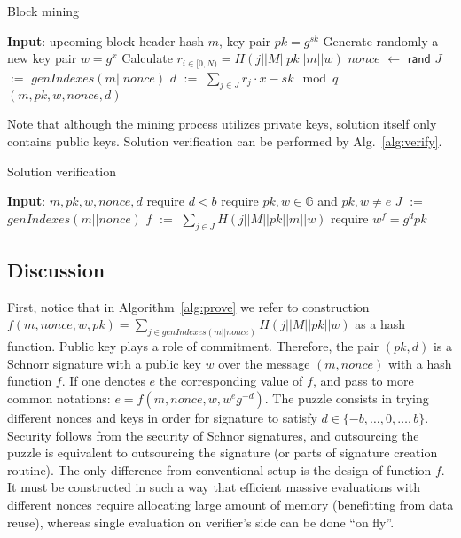 \documentclass[]{article}
\def\Let#1#2{\State #1 $:=$ #2}
\def\LetRnd#1#2{\State #1 $\gets$ #2}
\begin{document}
    \begin{algorithm}[H]
        \caption{Block mining}
        \label{alg:prove}
        \begin{algorithmic}[1]
            \State \textbf{Input}: upcoming block header hash $m$, key pair $pk=g^{sk}$
            \State Generate randomly a new key pair $w=g^x$
            \State Calculate $r_{i \in [0,N)}=H(j||M||pk||m||w)$
            \LetRnd{$nonce$}{$\mathsf{rand}$}
            \Let{$J$}{$genIndexes(m||nonce)$}
            \Let{$d$}{$\sum_{j \in J}{r_j} \cdot x - sk \mod q$}
            \State \Return $(m,pk,w,nonce,d)$
            \EndIf
            \EndWhile
        \end{algorithmic}
    \end{algorithm}

    Note that although the mining process utilizes private keys, solution itself
    only contains public keys. Solution verification can be performed by Alg.~\ref{alg:verify}.

    \begin{algorithm}[H]
        \caption{Solution verification}
        \label{alg:verify}
        \begin{algorithmic}[1]
            \State \textbf{Input}: $m,pk,w,nonce,d$
            \State require $d < b$
            \State require $pk,w\in \mathbb{G}$ and $pk,w \ne e$
            \Let{$J$}{$genIndexes(m||nonce)$}
            \Let{$f$}{$\sum_{j \in J} H(j||M||pk||m||w)$}
            \State require $w^f = g^dpk$
        \end{algorithmic}
    \end{algorithm}


    \subsection{Discussion}
    \label{discussion}

    First, notice that in Algorithm~\ref{alg:prove} we refer to construction
    $f(m,nonce,w,pk)=\sum_{j\in genIndexes(m||nonce)} H(j||M||pk||w)$ as a hash
    function. Public key plays a role of commitment. Therefore, the pair
    $(pk,d)$ is a Schnorr signature with a public key $w$ over the message
    $(m,nonce)$ with a hash function $f$. If one denotes $e$ the corresponding
    value of $f$, and pass to more common notations:
    $e=f(m,nonce,w,w^eg^{-d})$. The puzzle consists in trying
    different nonces and keys in order for signature to satisfy
    $d\in\{-b,\dots,0,\dots,b\}$. Security follows from the security of Schnor
    signatures, and outsourcing the puzzle is equivalent to outsourcing the
    signature (or parts of signature creation routine). The only difference from
    conventional setup is the design of function $f$. It must be constructed in such
    a way that efficient massive evaluations with different nonces require
    allocating large amount of memory (benefitting from data reuse), whereas
    single evaluation on verifier's side can be done ``on fly''.
\end{document}
